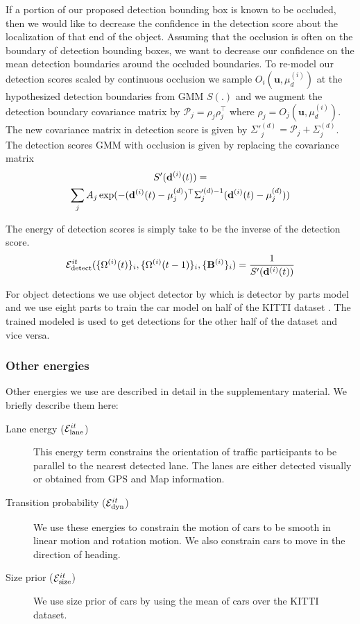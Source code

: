 If a portion of our proposed detection bounding box is known to be
occluded, then we would like to decrease the confidence in the detection score
about the localization of that end of the object. Assuming that the occlusion
is often on the boundary of detection bounding boxes, we want to decrease our
confidence on the mean detection boundaries around the occluded boundaries.
To re-model our detection scores scaled by continuous occlusion we sample
$O_{i}(\mathbf{u}, \mu^{(i)}_d)$ at the hypothesized detection boundaries from
GMM $S(.)$ and we augment the detection boundary covariance matrix by
$\mathcal{P}_{j} = \rho_{j}\rho_{j}^\top$ where $\rho_{j} = O_{j}(\mathbf{u},
\mu^{(i)}_d)$. The new covariance matrix in detection score is given by 
  $\Sigma'^{(d)}_j = \mathcal{P}_{j} + \Sigma^{(d)}_j$.
The detection scores GMM with occlusion is given by replacing the covariance
matrix
%
\begin{multline}
  S'(\mathbf{d}^{(i)}(t)) =
  \\
  \sum_j A_j \exp(-(\mathbf{d}^{(i)}(t)-\mu^{(d)}_j)^\top \Sigma'^{(d)-1}_j
  (\mathbf{d}^{(i)}(t)-\mu^{(d)}_j))
\end{multline}

The energy of detection scores is simply take to be the inverse of the detection score.
\begin{align}
  \mathcal{E}^{it}_{\text{detect}}(\{ \Omega^{(i)}(t) \}_i, \{ \Omega^{(i)}(t-1) \}_i, \{\mathbf{B}^{(i)}\}_i ) = \frac{1}{S'(\mathbf{d}^{(i)}(t))}
\end{align}

For object detections we use object detector by \cite{Felzenszwalb_etal_2010}
which is detector by parts model and we use eight parts to train the car model 
on half of the KITTI dataset \cite{geiger2013vision}. The trained modeled is 
used to get detections for the other half of the dataset and vice versa. 

\subsubsection{Other energies}
Other energies we use are described in detail in the supplementary material. We briefly describe them here:
\begin{description}
  \item[Lane energy ($\mathcal{E}^{it}_{\text{lane}}$)] This energy term constrains the
    orientation of traffic participants to be parallel to the nearest detected
    lane. The lanes are either detected visually or obtained from GPS and Map 
    information.
  \item[Transition probability ($\mathcal{E}^{it}_{\text{dyn}}$)] We use these energies to
    constrain the motion of cars to be smooth in linear motion and rotation
    motion. We also constrain cars to move in the direction of heading.
  \item[Size prior ($\mathcal{E}^{it}_{\text{size}}$)] We use size prior of cars by using the mean
    of cars over the KITTI dataset.
\end{description}

